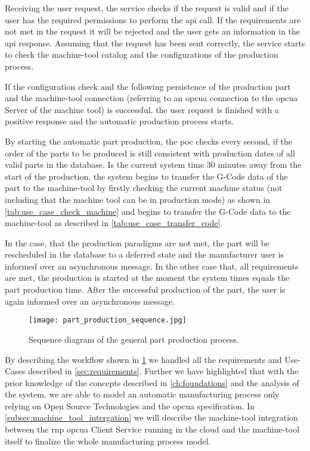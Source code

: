 \documentclass[
a4paper,
twoside,
headsepline,
cleardoublepage=empty,
parskip=half,
draft=false
]{scrbook}
\begin{document}
				Receiving the user request, the service checks if the request is valid and if the user has the required permissions to perform the \gls{api} call. If the requirements are not met in the request it will be rejected and the user gets an information in the \gls{api} response. Assuming that the request has been sent correctly, the service starts to check the machine-tool catalog and the configurations of the production process.
				
				If the configuration check and the following persistence of the production part and the machine-tool connection (referring to an \gls{opcua} connection to the \gls{opcua} Server of the machine tool) is successful, the user request is finished with a positive response and the automatic production process starts.
				
				By starting the automatic part production, the \gls{poc} checks every second, if the order of the parts to be produced is still consistent with production dates of all valid parts in the database. Is the current system time 30 minutes away from the start of the production, the system begins to transfer the G-Code data of the part to the machine-tool by firstly checking the current machine status (not including that the machine tool can be in production mode) as shown in \cref{tab:use_case_check_machine} and begins to transfer the G-Code data to the machine-tool as described in \cref{tab:use_case_transfer_code}.
				
				In the case, that the production paradigms are not met, the part will be rescheduled in the database to a deferred state and the manufacturer user is informed over an asynchronous message. In the other case that, all requirements are met, the production is started at the moment the system times equals the part production time. After the successful production of the part, the user is again informed over an asynchronous message.
				
				\begin{figure}[htbp]
					\centering
					\texttt{[image: part\_production\_sequence.jpg]}
					\caption{Sequence diagram of the general part production process.}
					\label{fig:poc_workflow_diagram}
				\end{figure}
				
				By describing the workflow shown in \cref{fig:poc_workflow_diagram} we handled all the requirements and Use-Cases described in \cref{sec:requirements}. Further we have highlighted that with the prior knowledge of the concepts described in \cref{ch:foundations} and the analysis of the system, we are able to model an automatic manufacturing process only relying on Open Source Technologies and the \gls{opcua} specification. In \cref{subsec:machine_tool_intergation} we will describe the machine-tool integration between the \gls{rnp} \gls{opcua} Client Service running in the cloud and the machine-tool itself to finalize the whole manufacturing process model.
				
\end{document}

